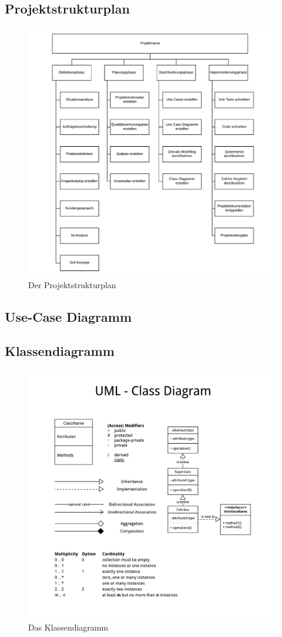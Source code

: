 \documentclass[11pt, a4paper]{article}
\begin{document}
    \subsection{Projektstrukturplan}
      \begin{figure}[h!]
        \includegraphics[width=\linewidth]{fig/Projektstrukturplan.pdf}
        \caption{Der Projektstrukturplan}
        \label{fig:psp}
      \end{figure}
      \newpage
    \subsection{Use-Case Diagramm}
    \subsection{Klassendiagramm}
      \begin{figure}[h!]
        \includegraphics[width=\linewidth]{fig/UML_Classdiagram.pdf}
        \caption{Das Klassendiagramm}
        \label{fig:classdiagram}
      \end{figure}
      \newpage
\end{document}
